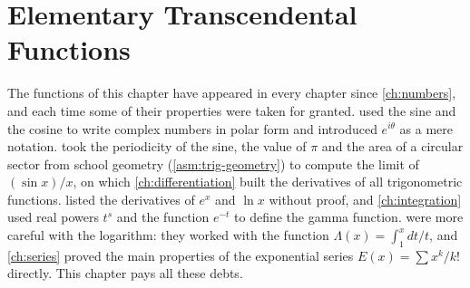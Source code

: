 \chapter{Elementary Transcendental Functions}
\label{ch:transcendental}


The functions of this chapter have appeared in every chapter since \cref{ch:numbers}, and each time some of their properties were taken for granted.  used the sine and the cosine to write complex numbers in polar form and introduced $e^{i\theta}$ as a mere notation.  took the periodicity of the sine, the value of $\pi$ and the area of a circular sector from school geometry (\cref{asm:trig-geometry}) to compute the limit of $(\sin x)/x$, on which \cref{ch:differentiation} built the derivatives of all trigonometric functions.  listed the derivatives of $e^x$ and $\ln x$ without proof, and \cref{ch:integration} used real powers $t^s$ and the function $e^{-t}$ to define the gamma function.  were more careful with the logarithm: they worked with the function $\Lambda(x)=\int_1^xdt/t$, and \cref{ch:series} proved the main properties of the exponential series $E(x)=\sum x^k/k!$ directly. This chapter pays all these debts.

